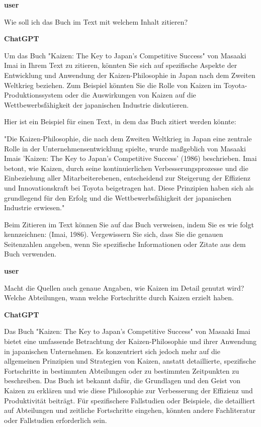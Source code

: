 \textbf{user}

Wie soll ich das Buch im Text mit welchem Inhalt zitieren?

\textbf{ChatGPT}

Um das Buch "Kaizen: The Key to Japan's Competitive Success" von Masaaki Imai in Ihrem Text zu zitieren, könnten Sie sich auf spezifische Aspekte der Entwicklung und Anwendung der Kaizen-Philosophie in Japan nach dem Zweiten Weltkrieg beziehen. Zum Beispiel könnten Sie die Rolle von Kaizen im Toyota-Produktionssystem oder die Auswirkungen von Kaizen auf die Wettbewerbsfähigkeit der japanischen Industrie diskutieren.

Hier ist ein Beispiel für einen Text, in dem das Buch zitiert werden könnte:

"Die Kaizen-Philosophie, die nach dem Zweiten Weltkrieg in Japan eine zentrale Rolle in der Unternehmensentwicklung spielte, wurde maßgeblich von Masaaki Imais 'Kaizen: The Key to Japan's Competitive Success' (1986) beschrieben. Imai betont, wie Kaizen, durch seine kontinuierlichen Verbesserungsprozesse und die Einbeziehung aller Mitarbeiterebenen, entscheidend zur Steigerung der Effizienz und Innovationskraft bei Toyota beigetragen hat. Diese Prinzipien haben sich als grundlegend für den Erfolg und die Wettbewerbsfähigkeit der japanischen Industrie erwiesen."

Beim Zitieren im Text können Sie auf das Buch verweisen, indem Sie es wie folgt kennzeichnen: (Imai, 1986). Vergewissern Sie sich, dass Sie die genauen Seitenzahlen angeben, wenn Sie spezifische Informationen oder Zitate aus dem Buch verwenden.

\textbf{user}

Macht die Quellen auch genaue Angaben, wie Kaizen im Detail genutzt wird? Welche Abteilungen, wann welche Fortschritte durch Kaizen erzielt haben. 

\textbf{ChatGPT}

Das Buch "Kaizen: The Key to Japan's Competitive Success" von Masaaki Imai bietet eine umfassende Betrachtung der Kaizen-Philosophie und ihrer Anwendung in japanischen Unternehmen. Es konzentriert sich jedoch mehr auf die allgemeinen Prinzipien und Strategien von Kaizen, anstatt detaillierte, spezifische Fortschritte in bestimmten Abteilungen oder zu bestimmten Zeitpunkten zu beschreiben. Das Buch ist bekannt dafür, die Grundlagen und den Geist von Kaizen zu erklären und wie diese Philosophie zur Verbesserung der Effizienz und Produktivität beiträgt. Für spezifischere Fallstudien oder Beispiele, die detailliert auf Abteilungen und zeitliche Fortschritte eingehen, könnten andere Fachliteratur oder Fallstudien erforderlich sein.

